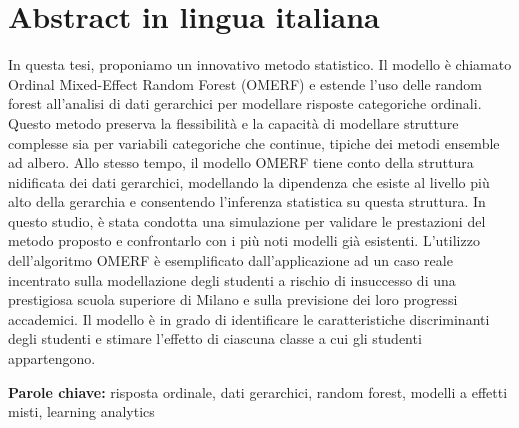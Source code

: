 \documentclass[11pt,a4paper]{article}
\begin{document}











%

\cleardoublepage

\section*{Abstract in lingua italiana}
In questa tesi, proponiamo un innovativo metodo statistico. Il modello è chiamato Ordinal Mixed-Effect Random Forest (OMERF) e estende l'uso delle random forest all'analisi di dati gerarchici per modellare risposte categoriche ordinali.
Questo metodo preserva la flessibilità e la capacità di modellare strutture complesse sia per variabili categoriche che continue, tipiche dei metodi ensemble ad albero.
Allo stesso tempo, il modello OMERF tiene conto della struttura nidificata dei dati gerarchici, modellando la dipendenza che esiste al livello più alto della gerarchia e consentendo l'inferenza statistica su questa struttura.
In questo studio, è stata condotta una simulazione per validare le prestazioni del metodo proposto e confrontarlo con i più noti modelli già esistenti.
L'utilizzo dell'algoritmo OMERF è esemplificato dall'applicazione ad un caso reale incentrato sulla modellazione degli studenti a rischio di insuccesso di una prestigiosa scuola superiore di Milano e sulla previsione dei loro progressi accademici.
Il modello è in grado di identificare le caratteristiche discriminanti degli studenti e stimare l'effetto di ciascuna classe a cui gli studenti appartengono.
\vspace{15pt}
\begin{tcolorbox}[arc=0pt, boxrule=0pt, colback=bluePoli!60, width=\textwidth, colupper=white]
    \textbf{Parole chiave:} risposta ordinale, dati gerarchici, random forest, modelli a effetti misti, learning analytics 
\end{tcolorbox}
\end{document}
